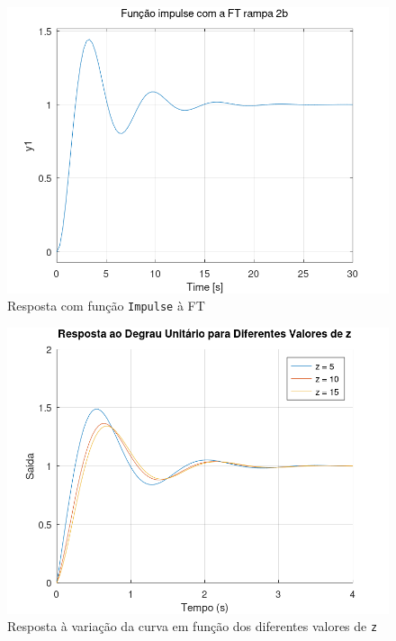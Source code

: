\documentclass[a4paper,12pt]{article}
\begin{document}
    \begin{figure}[h]
        \centering
        \includegraphics[scale=0.4]{../fig/fig2bImpulse.png}
        \caption{Resposta com função \texttt{Impulse} à FT}
        \label{fig2bImpulse}
    \end{figure}
    \begin{figure}[h]
        \centering
        \includegraphics[scale=0.4]{../fig/fig4.png}
        \caption{Resposta à variação da curva em função dos diferentes valores de \texttt{z}}
        \label{fig4}
    \end{figure}


    \clearpage
    \printbibliography
\end{document}
